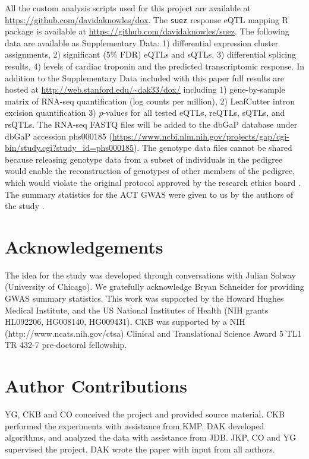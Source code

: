 \documentclass{article}
\begin{document}
All the custom analysis scripts used for this project are available at \url{https://github.com/davidaknowles/dox}. 
The \texttt{suez} response eQTL mapping R package is available at \url{https://github.com/davidaknowles/suez}. 
The following data are available as Supplementary Data: 1) differential expression cluster assignments, 2) significant (5\% FDR) eQTLs and sQTLs, 3) differential splicing results, 4) levels of cardiac troponin and the predicted transcriptomic response. 
In addition to the Supplementary Data included with this paper full results are hosted at \url{http://web.stanford.edu/~dak33/dox/} including 1) gene-by-sample matrix of RNA-seq quantification (log counts per million), 2) LeafCutter intron excision quantification 3) $p$-values for all tested eQTLs, reQTLs, sQTLs, and rsQTLs. 
The RNA-seq FASTQ files will be added to the dbGaP database \cite{Tryka2014} under dbGaP accession phs000185
(\url{https://www.ncbi.nlm.nih.gov/projects/gap/cgi-bin/study.cgi?study_id=phs000185}).
The genotype data files cannot be shared because releasing genotype data
from a subset of individuals in the pedigree would enable the reconstruction of
genotypes of other members of the pedigree, which would violate the original
protocol approved by the research ethics board \cite{Livne2015}. 
The summary statistics for the ACT GWAS were given to us by the authors of the study
\cite{Schneider2016}.

\section*{Acknowledgements}

The idea for the study was developed through conversations with Julian Solway (University of Chicago). We gratefully acknowledge Bryan Schneider for providing GWAS summary statistics. This work was supported by the Howard Hughes Medical Institute, and the US National Institutes of Health (NIH grants HL092206, HG008140, HG009431). 
CKB was supported by a NIH (http://www.ncats.nih.gov/ctsa) Clinical and Translational Science Award 5 TL1 TR 432-7 pre-doctoral fellowship.

\section*{Author Contributions}

YG, CKB and CO conceived the project and provided source material.
CKB performed the experiments with assistance from KMP.
DAK developed algorithms, and analyzed the data with assistance from JDB.
JKP, CO and YG supervised the project.
DAK wrote the paper with input from all authors.
\end{document}
